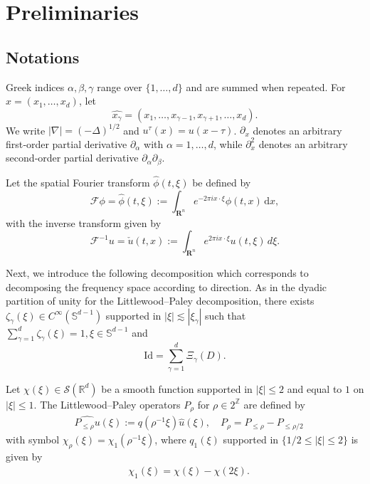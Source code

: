 \documentclass[11pt,letterpaper,reqno]{amsart}
\numberwithin{equation}{section}
\theoremstyle{definition}
\theoremstyle{remark}
\begin{document}
 


\section{Preliminaries} \label{sec2}
\subsection{Notations} \label{subsec.not}
Greek indices
$\alpha,\beta,\gamma$ range over $\{1,\ldots,d\}$ and are summed when repeated.
For $x=(x_1,\ldots,x_d)$, let
\[
 \widehat {x_{\gamma}}
 =(x_1,\ldots,x_{\gamma-1},x_{\gamma+1},\ldots,x_d).
\]
We write $|\nabla|=(-\Delta)^{1/2}$ and
$u^\tau(x)=u(x-\tau)$.  \(\partial_x\) denotes an arbitrary first‑order partial derivative \(\partial_{\alpha}\) with  \(\alpha = 1, \dots, d\), while 
 \(\partial_x^2\) denotes an arbitrary second‑order partial derivative \(\partial_{\alpha} \partial_{\beta}\).   

 Let the spatial Fourier transform $\hat{\phi}(t, \xi)$ be defined by
$$
\mathscr{F}\phi =\hat{\phi}(t, \xi):=\int_{\mathbf{R}^n} e^{-2 \pi i x \cdot \xi} \phi(t, x) \, \mathrm{d}x,
$$
with the inverse transform given by
$$
\mathscr{F}^{-1} u = \check{u}(t, x):=\int_{\mathbf{R}^n} e^{2 \pi i x \cdot \xi} u(t, \xi) \, d\xi.
$$

Next, we introduce the following decomposition which corresponds to decomposing the frequency space according to direction. As in the dyadic partition of unity for the Littlewood–Paley decomposition, there exists $\zeta_{\gamma}(\xi) \in C^\infty ( \mathbb{S}^{d-1})$ supported in $  |\xi| \lesssim|\xi_\gamma|$ such that
$ \sum_{\gamma=1}^{d} \zeta_\gamma (\xi)=1, \xi \in \mathbb{S}^{d-1}$
and
 \begin{equation} 
     \text{Id}=\sum_{\gamma=1}^{d} \Xi_\gamma (D) . \label{decomp_Xi}
 \end{equation} 
 
  Let \(\chi(\xi) \in \mathcal{S}(\mathbb{R}^d)\) be a smooth function supported in \(|\xi| \leq 2\) and equal to \(1\) on \(|\xi| \leq 1\). The Littlewood–Paley operators \(P_\rho\) for \(\rho \in 2^{\mathbb{Z}}\) are defined by  
\begin{align}
&\widehat{P_{\leq \rho} u}(\xi):=q\left( \rho^{-1} \xi\right) \widehat{u}(\xi),\quad P_\rho=P_{\leq \rho}-P_{\leq  \rho/2}\nonumber
\end{align}
with symbol  \(\chi_\rho(\xi) = \chi_1(\rho^{-1}\xi)\), where $q_1(\xi)$ supported in \(\{1/2 \leq |\xi| \leq 2\}\) is given by   
\begin{align}\label{LPD}
	&\chi_1\left(\xi\right)=\chi\left(\xi\right)-\chi \left(2\xi\right).
\end{align}
\end{document}
